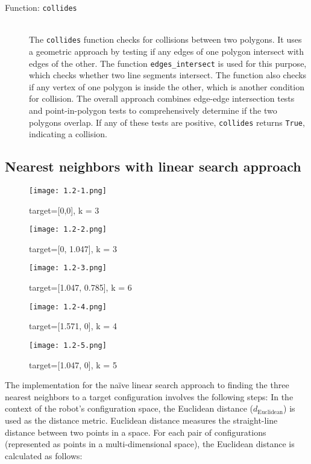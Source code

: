 \documentclass{article}
\begin{document}
\begin{description}
  \item[Function: \texttt{collides}] \hfill \\
  The \texttt{collides} function checks for collisions between two polygons. It uses a geometric approach by testing if any edges of one polygon intersect with edges of the other. The function \texttt{edges\_intersect} is used for this purpose, which checks whether two line segments intersect. The function also checks if any vertex of one polygon is inside the other, which is another condition for collision. The overall approach combines edge-edge intersection tests and point-in-polygon tests to comprehensively determine if the two polygons overlap. If any of these tests are positive, \texttt{collides} returns \texttt{True}, indicating a collision.
\end{description}

\subsection{Nearest neighbors with linear search approach}

\begin{figure}[h]
    \centering
    \begin{minipage}{0.32\textwidth}
        \texttt{[image: 1.2-1.png]}
        \caption{target=[0,0], k = 3}
    \end{minipage}
    \hfill
    \begin{minipage}{0.32\textwidth}
        \texttt{[image: 1.2-2.png]}
        \caption{target=[0, 1.047], k = 3}
    \end{minipage}
    \hfill
    \begin{minipage}{0.32\textwidth}
        \texttt{[image: 1.2-3.png]}
        \caption{target=[1.047, 0.785], k = 6}
    \end{minipage}

    \vspace{5mm} %

    \begin{minipage}{0.32\textwidth}
        \texttt{[image: 1.2-4.png]}
        \caption{target=[1.571, 0], k = 4}
    \end{minipage}
    \hfill
    \begin{minipage}{0.32\textwidth}
        \texttt{[image: 1.2-5.png]}
        \caption{target=[1.047, 0], k = 5}
    \end{minipage}

\end{figure}
The implementation for the naïve linear search approach to finding the three nearest neighbors to a target configuration involves the following steps:
In the context of the robot's configuration space, the Euclidean distance (\(d_{\text{Euclidean}}\)) is used as the distance metric. Euclidean distance measures the straight-line distance between two points in a space. For each pair of configurations (represented as points in a multi-dimensional space), the Euclidean distance is calculated as follows:
\end{document}
